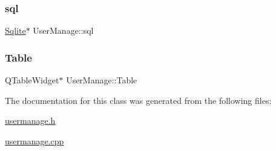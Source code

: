\subsubsection{\texorpdfstring{sql}{sql}}
{\footnotesize\ttfamily \mbox{\hyperlink{class_sqlite}{Sqlite}}$\ast$ User\+Manage\+::sql\hspace{0.3cm}{\ttfamily [private]}}

\mbox{\label{class_user_manage_a11482daf138a82958adac62c8f5fc1fe}} 
\subsubsection{\texorpdfstring{Table}{Table}}
{\footnotesize\ttfamily Q\+Table\+Widget$\ast$ User\+Manage\+::\+Table\hspace{0.3cm}{\ttfamily [private]}}



The documentation for this class was generated from the following files\+:\begin{DoxyCompactItemize}
\item 
\mbox{\hyperlink{usermanage_8h}{usermanage.\+h}}\item 
\mbox{\hyperlink{usermanage_8cpp}{usermanage.\+cpp}}\end{DoxyCompactItemize}
